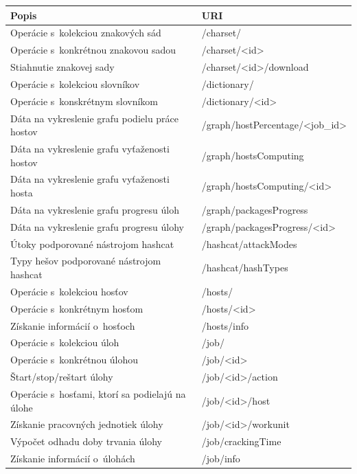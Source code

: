 \documentclass[slovak]{fitthesis}
\begin{document}
\begin{table}[h]
  \begin{center}
        \begin{tabular}{ |p{8cm}|p{7.4cm}|  }
         \hline
         Popis& URI\\
         \hline
          Operácie s~kolekciou znakových sád & /charset/ \\
          Operácie s~konkrétnou znakovou sadou & /charset/<id> \\
          Stiahnutie znakovej sady & /charset/<id>/download \\
          Operácie s~kolekciou slovníkov & /dictionary/ \\
          Operácie s~konskrétnym slovníkom & /dictionary/<id> \\
          Dáta na vykreslenie grafu podielu práce hostov & /graph/hostPercentage/<job\_id> \\
          Dáta na vykreslenie grafu vyťaženosti hostov & /graph/hostsComputing \\
          Dáta na vykreslenie grafu vyťaženosti hosta & /graph/hostsComputing/<id> \\
          Dáta na vykreslenie grafu progresu úloh & /graph/packagesProgress \\
          Dáta na vykreslenie grafu progresu úlohy & /graph/packagesProgress/<id> \\
          Útoky podporované nástrojom hashcat & /hashcat/attackModes \\
          Typy hešov podporované nástrojom hashcat & /hashcat/hashTypes \\
          Operácie s~kolekciou hosťov & /hosts/ \\
          Operácie s~konkrétnym hosťom & /hosts/<id> \\
          Získanie informácií o~hosťoch & /hosts/info \\
          Operácie s~kolekciou úloh & /job/ \\
          Operácie s~konkrétnou úlohou & /job/<id> \\
          Štart/stop/reštart úlohy & /job/<id>/action \\
          Operácie s~hosťami, ktorí sa podielajú na úlohe & /job/<id>/host \\
          Získanie pracovných jednotiek úlohy & /job/<id>/workunit \\
          Výpočet odhadu doby trvania úlohy & /job/crackingTime \\
          Získanie informácií o~úlohách & /job/info \\

\end{tabular}
\end{center}
\end{table}
\end{document}

